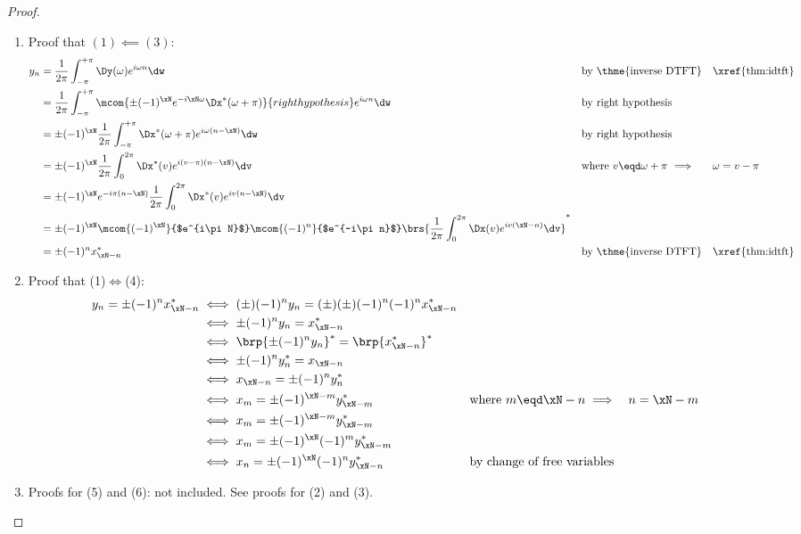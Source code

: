 \begin{proof}
\begin{enumerate}
  \item Proof that $(1)\impliedby(3)$:
    \begin{align*}
      y_n
        &= \frac{1}{2\pi}\int_{-\pi}^{+\pi} \Dy(\omega) e^{i\omega n} \dw
        && \text{by \thme{inverse DTFT}}
        && \text{\xref{thm:idtft}}
      \\&= \frac{1}{2\pi}\int_{-\pi}^{+\pi} \mcom{\pm (-1)^\xN e^{-i\xN\omega} \Dx^\ast(\omega+\pi)}{right hypothesis} e^{i\omega n} \dw
        && \text{by right hypothesis}
      \\&= \pm (-1)^\xN\frac{1}{2\pi}\int_{-\pi}^{+\pi}  \Dx^\ast(\omega+\pi) e^{i\omega(n-\xN)} \dw
        && \text{by right hypothesis}
      \\&= \pm (-1)^\xN\frac{1}{2\pi}\int_{0}^{2\pi}  \Dx^\ast(v) e^{i(v-\pi)(n-\xN)} \dv
        && \text{where $v\eqd\omega+\pi$ $\implies$}
        && \text{$\omega=v-\pi$}
      \\&= \pm (-1)^\xN e^{-i\pi(n-\xN)} \frac{1}{2\pi}\int_{0}^{2\pi}  \Dx^\ast(v) e^{iv(n-\xN)} \dv
      \\&= \pm (-1)^\xN \mcom{(-1)^\xN}{$e^{i\pi N}$} \mcom{(-1)^n}{$e^{-i\pi n}$}
           \brs{\frac{1}{2\pi}\int_{0}^{2\pi}  \Dx(v) e^{iv(\xN-n)} \dv}^\ast
      \\&= \pm (-1)^n x_{\xN-n}^\ast
        && \text{by \thme{inverse DTFT}}
        && \text{\xref{thm:idtft}}
    \end{align*}

  \item Proof that (1)$\iff$(4): %
    \begin{align*}
      y_{n} = \pm (-1)^n x^\ast_{\xN-n}
        &\iff (\pm)(-1)^n y_{n} = (\pm)(\pm) (-1)^n (-1)^n x^\ast_{\xN-n}
      \\&\iff \pm(-1)^n y_{n} = x^\ast_{\xN-n}
      \\&\iff \brp{\pm(-1)^n y_{n}}^\ast = \brp{x^\ast_{\xN-n}}^\ast
      \\&\iff \pm(-1)^n y^\ast_{n} = x_{\xN-n}
      \\&\iff x_{\xN-n} = \pm(-1)^n y^\ast_{n}
      \\&\iff x_m = \pm(-1)^{\xN-m} y^\ast_{\xN-m}
        && \text{where $m\eqd \xN-n\implies$}
        && \text{$n=\xN-m$}
      \\&\iff x_m = \pm(-1)^{\xN-m} y^\ast_{\xN-m}
      \\&\iff x_m = \pm(-1)^\xN (-1)^m y^\ast_{\xN-m}
      \\&\iff x_n = \pm(-1)^\xN (-1)^n y^\ast_{\xN-n}
        &&    \text{by change of free variables}
    \end{align*}

  \item Proofs for (5) and (6): not included. See proofs for (2) and (3).
\end{enumerate}
\end{proof}

